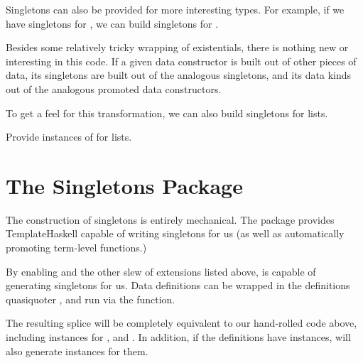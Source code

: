 \documentclass[book.tex]{subfiles}
\begin{document}
Singletons can also be provided for more interesting types. For example, if we
have singletons for , we can build singletons for .


Besides some relatively tricky wrapping of existentials, there is nothing new or
interesting in this code. If a given data constructor is built out of other
pieces of data, its singletons are built out of the analogous singletons, and
its data kinds out of the analogous promoted data constructors.

To get a feel for this transformation, we can also build singletons for lists.


\begin{exercise}
Provide instances of  for lists.
\end{exercise}
\begin{solution}
\end{solution}


\section{The Singletons Package}


The construction of singletons is entirely mechanical. The 
\cite{singletons} package provides TemplateHaskell capable of writing singletons
for us (as well as automatically promoting term-level functions.)

By enabling  and the other slew of extensions listed above,
 is capable of generating singletons for us. Data definitions
can be wrapped in the definitions quasiquoter \hs{[d| ... |]}, and run via the
 function.


The resulting splice will be completely equivalent to our hand-rolled code
above, including instances for ,  and . In
addition, if the definitions have  instances,  will also
generate  instances for them.

\end{document}
